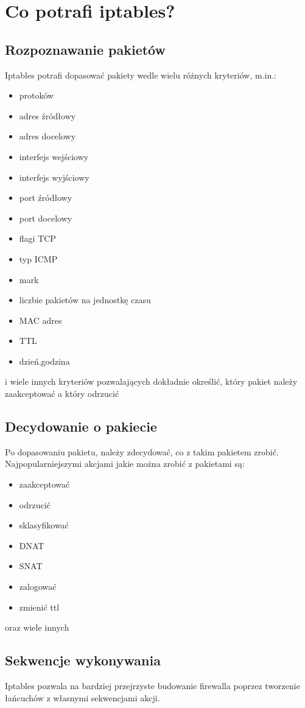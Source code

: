\documentclass[a4paper,12pt]{article}
\begin{document}
\section{Co potrafi iptables?}
\subsection{Rozpoznawanie pakietów}
Iptables potrafi dopasować pakiety wedle wielu różnych kryteriów, m.in.:
\begin{itemize}
\item protoków
\item adres źródłowy
\item adres docelowy
\item interfejs wejściowy
\item interfejs wyjściowy
\item port źródłowy
\item port docelowy
\item flagi TCP
\item typ ICMP
\item mark
\item liczbie pakietów na jednostkę czasu
\item MAC adres
\item TTL
\item dzień,godzina
\end{itemize}
i wiele innych kryteriów pozwalających dokładnie określić, który pakiet należy zaakceptować a który odrzucić
\subsection{Decydowanie o pakiecie}
Po dopasowaniu pakietu, należy zdecydować, co z takim pakietem zrobić. Najpopularniejszymi akcjami jakie można zrobić z pakietami są:
\begin{itemize}
\item zaakceptować
\item odrzucić
\item sklasyfikować
\item DNAT
\item SNAT
\item zalogować
\item zmienić ttl
\end{itemize}
oraz wiele innych
\subsection{Sekwencje wykonywania}
Iptables pozwala na bardziej przejrzyste budowanie firewalla poprzez tworzenie łańcuchów z własnymi sekwencjami akcji.
\end{document}
